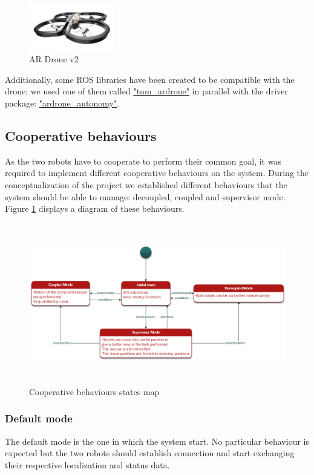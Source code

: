 \documentclass[11pt,a4paper]{article}
\begin{document}
\begin{figure}[ht]	
\centering
\includegraphics[height=2cm]{arDroneGpsEdition.png}
\caption{AR Drone v2}
\end{figure}

Additionally, some ROS libraries have been created to be compatible with the drone; we used
one of them called \href{"http://wiki.ros.org/tum_ardrone"}{"tum\_ardrone"} in parallel with
the driver package: \href{"https://github.com/AutonomyLab/ardrone_autonomy"}
{"ardrone\_autonomy"}.

\subsection{Cooperative behaviours}
As the two robots have to cooperate to perform their common goal, it was required to implement different cooperative behaviours
on the system. During the conceptualization of the project we established different
 behaviours that the system should be able to manage: decoupled, coupled and supervisor mode. Figure \ref{fig:Coop} displays a diagram of these behaviours.

\begin{figure}[ht]	
\includegraphics[height=7cm]{cooperativeModes.png}
\caption{Cooperative behaviours states map}
\label{fig:Coop}
\end{figure}

\subsubsection{Default mode}
The default mode is the one in which the system start. No particular behaviour is expected but the two
robots should establish connection and start exchanging their respective localization and status data.
\end{document}
